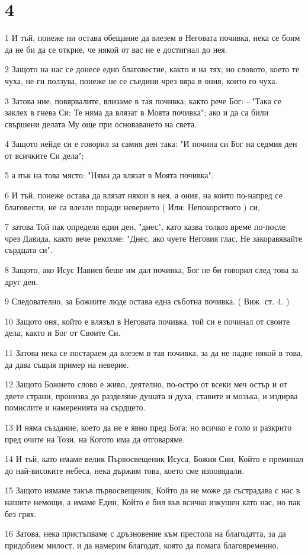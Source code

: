 \chapter{4}

\par 1 И тъй, понеже ни остава обещание да влезем в Неговата почивка, нека се боим да не би да се открие, че някой от вас не е достигнал до нея.
\par 2 Защото на нас се донесе едно благовестие, както и на тях; но словото, което те чуха, не ги ползува, понеже не се съедини чрез вяра в ония, които го чуха.
\par 3 Затова ние, повярвалите, влизаме в тая почивка; както рече Бог: - "Така се заклех в гнева Си: Те няма да влязат в Моята почивка"; ако и да са били свършени делата Му още при основаването на света.
\par 4 Защото нейде си е говорил за самия ден така: "И почина си Бог на седмия ден от всичките Си дела";
\par 5 а пък на това място: "Няма да влязат в Моята почивка".
\par 6 И тъй, понеже остава да влязат някои в нея, а ония, на които по-напред се благовести, не са влезли поради неверието ( Или: Непокорството ) си,
\par 7 затова Той пак определя един ден, "днес", като казва толкоз време по-после чрез Давида, както вече рекохме: "Днес, ако чуете Неговия глас, Не закоравявайте сърдцата си".
\par 8 Защото, ако Исус Навиев беше им дал почивка, Бог не би говорил след това за друг ден.
\par 9 Следователно, за Божиите люде остава една съботна почивка. ( Виж. ст. 4. )
\par 10 Защото оня, който е влязъл в Неговата почивка, той си е починал от своите дела, както и Бог от Своите Си.
\par 11 Затова нека се постараем да влезем в тая почивка, за да не падне някой в това, да дава същия пример на неверие.
\par 12 Защото Божието слово е живо, деятелно, по-остро от всеки меч остър и от двете страни, пронизва до разделяне душата и духа, ставите и мозъка, и издирва помислите и намеренията на сърдцето.
\par 13 И няма създание, което да не е явно пред Бога; но всичко е голо и разкрито пред очите на Този, на Когото има да отговаряме.
\par 14 И тъй, като имаме велик Първосвещеник Исуса, Божия Син, Който е преминал до най-високите небеса, нека държим това, което сме изповядали.
\par 15 Защото нямаме такъв първосвещеник, Който да не може да състрадава с нас в нашите немощи, а имаме Един, Който е бил във всичко изкушен като нас, но пак без грях.
\par 16 Затова, нека пристъпваме с дръзновение към престола на благодатта, за да придобием милост, и да намерим благодат, която да помага благовременно.

